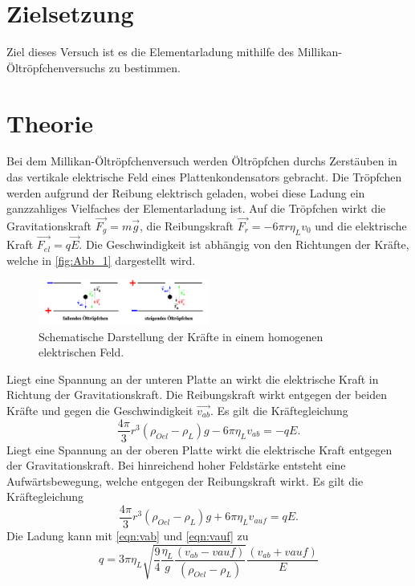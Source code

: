 \section{Zielsetzung}
\label{sec:Zielsetzung}
Ziel dieses Versuch ist es die Elementarladung mithilfe des Millikan-Öltröpfchenversuchs zu bestimmen.
\section{Theorie}
\label{sec:Theorie}
Bei dem Millikan-Öltröpfchenversuch werden Öltröpfchen durchs Zerstäuben in das vertikale
elektrische Feld eines Plattenkondensators gebracht. Die Tröpfchen werden aufgrund der Reibung
elektrisch geladen, wobei diese Ladung ein ganzzahliges Vielfaches der Elementarladung ist.
Auf die Tröpfchen wirkt die Gravitationskraft $\vec{F_g}=m \vec{g}$, die Reibungskraft 
$\vec{F_r} = - 6 \pi r \eta_L v_0$ und die elektrische Kraft $\vec{F_{el}} = q \vec{E}$.
Die Geschwindigkeit ist abhängig von den Richtungen der Kräfte, welche in \autoref{fig:Abb_1} dargestellt wird.
\begin{figure}[H]
    \centering
    \includegraphics[width=0.5\textwidth]{Abbildungen/Abb_1.pdf}
    \caption {Schematische Darstellung der Kräfte in einem homogenen elektrischen Feld\cite[1]{V503}.}
    \label{fig:Abb_1}
\end{figure}
Liegt eine Spannung an der unteren Platte an wirkt die elektrische Kraft in Richtung der Gravitationskraft.
Die Reibungskraft wirkt entgegen der beiden Kräfte und gegen die Geschwindigkeit $\vec{v_{ab}}$.
Es gilt die Kräftegleichung
\begin{equation}
    \frac{4 \pi}{3} r^3 (\rho_{Oel}-\rho_L)g - 6 \pi \eta_L v_{ab} = - q E.
    \label{eqn:vab}
\end{equation}
Liegt eine Spannung an der oberen Platte wirkt die elektrische Kraft entgegen der Gravitationskraft.
Bei hinreichend hoher Feldstärke entsteht eine Aufwärtsbewegung, welche entgegen der Reibungskraft wirkt.
Es gilt die Kräftegleichung
\begin{equation}
    \frac{4\pi}{3} r^3 (\rho_{Oel}-\rho_L) g + 6 \pi \eta_L v_{auf} = q E.
    \label{eqn:vauf}
\end{equation}
Die Ladung kann mit \autoref{eqn:vab} und \autoref{eqn:vauf} zu
\begin{equation}
   q = 3 \pi \eta_L \sqrt{\frac{9}{4} \frac{\eta_L}{g} \frac{(v_{ab}-v{auf})}{(\rho_{Oel}-\rho_L)}} \frac{(v_{ab}+v{auf})}{E}
    \label{eqn:Ladung}
\end{equation}
